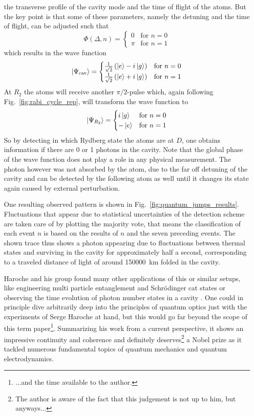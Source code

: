 the transverse profile of the cavity mode and
the time of flight of the atoms. But the key point is that some of these
parameters, namely the detuning and the time of flight, can be adjusted such
that
$$ \Phi(\Delta, n) = 
\begin{cases}
  0 & \text{for } n=0 \\
  \pi & \text{for } n=1
\end{cases}
$$
which results in the wave function 
$$ \ket{\Psi_{\text{cav}}} = 
\begin{cases}
  \frac{1}{\sqrt{2}} \left(\ket{e} - i\ket{g}\right) & \text{for } n=0\\
  \frac{1}{\sqrt{2}} \left(\ket{e} + i\ket{g}\right) & \text{for } n=1\\
\end{cases}
$$
At $R_2$ the atoms will receive another $\pi/2$-pulse which, again following
Fig.~\ref{fig:rabi_cycle_rep}, will transform the
wave function to 
$$ \ket{\Psi_{R_2}} = 
\begin{cases}
   i\ket{g} & \text{for } n=0\\
  -\ket{e}  & \text{for } n=1\\
\end{cases}
$$
So by detecting in which Rydberg state the atoms are at $D$, one obtains
information if there are 0 or 1 photons in the cavity. Note that the global
phase of the wave function does not play a role in any physical measurement. The
photon however was not absorbed by the atom, due to the far off detuning of the
cavity and can be detected by the following atom as well until it changes its
state again caused by external perturbation.

One resulting observed pattern is shown in Fig.~\ref{fig:quantum_jumps_results}.
Fluctuations that appear due to statistical uncertainties of the detection
scheme are taken care of by plotting the majority vote, that means the
classification of each event $n$ is based on the results of $n$ and the seven
preceding events. The shown trace thus shows a photon appearing due to
fluctuations between thermal states and surviving in the cavity for
approximately half a second, corresponding to a traveled distance of light of around
\SI{150000}{\kilo\meter} folded in the cavity.

Haroche and his group found many other applications of this or similar setups,
like engineering multi particle entanglement \cite{rauschenbeutel2000step} and
Schrödinger cat states \cite{brune1992manipulation} or observing
the time evolution of photon number states in a cavity
\cite{guerlin2007progressive}. One could in principle
dive arbitrarily deep into the principles of quantum optics just with the
experiments of Serge Haroche at hand, but this would go far beyond the scope of
this term paper\footnote{...and the time available to the author.}. Summarizing his work from a current perspective, it shows an
impressive continuity and coherence and definitely deserves\footnote{The author
is aware of the fact that this judgement is not up to him, but anyways...} a Nobel prize as it
tackled numerous fundamental topics of quantum mechanics and quantum
electrodynamics.

